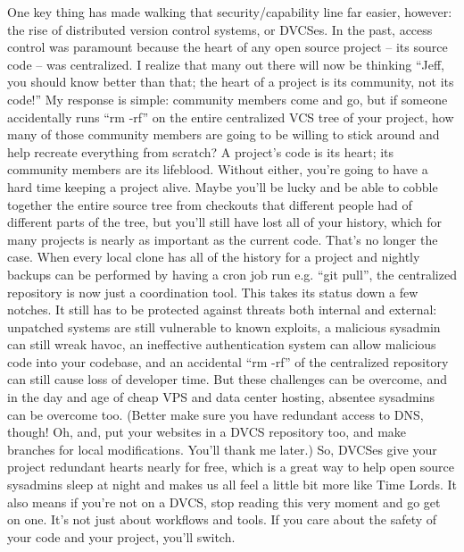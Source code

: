 One key thing has made walking that security/capability line far easier, however: the rise of distributed version control systems, or DVCSes.
In the past, access control was paramount because the heart of any open source project -- its source code -- was centralized. I realize that many out there will now be thinking “Jeff, you should know better than that; the heart of a project is its community, not its code!” My response is simple: community members come and go, but if someone accidentally runs “rm -rf” on the entire centralized VCS tree of your project, how many of those community members are going to be willing to stick around and help recreate everything from scratch? A project’s code is its heart; its community members are its lifeblood. Without either, you’re going to have a hard time keeping a project alive. Maybe you’ll be lucky and be able to cobble together the entire source tree from checkouts that different people had of different parts of the tree, but you’ll still have lost all of your history, which for many projects is nearly as important as the current code.
That’s no longer the case. When every local clone has all of the history for a project and nightly backups can be performed by having a cron job run e.g. “git pull”, the centralized repository is now just a coordination tool. This takes its status down a few notches. It still has to be protected against threats both internal and external: unpatched systems are still vulnerable to known exploits, a malicious sysadmin can still wreak havoc, an ineffective authentication system can allow malicious code into your codebase, and an accidental “rm -rf” of the centralized repository can still cause loss of developer time. But these challenges can be overcome, and in the day and age of cheap VPS and data center hosting, absentee sysadmins can be overcome too. (Better make sure you have redundant access to DNS, though! Oh, and, put your websites in a DVCS repository too, and make branches for local modifications. You’ll thank me later.)
So, DVCSes give your project redundant hearts nearly for free, which is a great way to help open source sysadmins sleep at night and makes us all feel a little bit more like Time Lords. It also means if you’re not on a DVCS, stop reading this very moment and go get on one. It’s not just about workflows and tools. If you care about the safety of your code and your project, you’ll switch.

